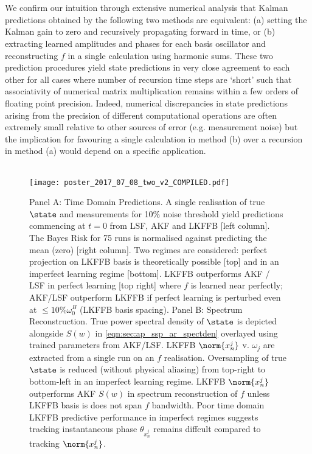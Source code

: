 \\
\\
We confirm our intuition through extensive numerical analysis that Kalman predictions obtained by the following two methods are equivalent: (a) setting the Kalman gain to zero and recursively propagating forward in time, or (b) extracting learned amplitudes and phases for each basis oscillator and reconstructing $f$ in a single calculation using harmonic sums. These two prediction procedures yield state predictions in very close agreement to each other for all cases where number of recursion time steps are `short' such that associativity of numerical matrix multiplication remains within a few orders of floating point precision. Indeed, numerical discrepancies in state predictions arising from the precision of different computational operations are often extremely small relative to other sources of error (e.g. measurement noise) but the implication for favouring a single calculation in method (b) over a recursion in method (a) would depend on a specific application.
\\
\\
 \begin{figure}[h] 
	\caption{Panel A: Time Domain Predictions. A single realisation of true $\state$ and measurements for 10\% noise threshold yield predictions commencing at $t=0$ from LSF, AKF and LKFFB  [left column]. The Bayes Risk for 75 runs is normalised against predicting the mean (zero) [right column]. Two regimes are considered: perfect projection on LKFFB basis is theoretically possible [top] and in an imperfect learning regime [bottom]. LKFFB outperforms AKF / LSF in perfect learning [top right] where $f$ is learned near perfectly; AKF/LSF outperform LKFFB if perfect learning is perturbed even at $\leq 10\% \omega_0^B$ (LKFFB basis spacing). Panel B: Spectrum Reconstruction. True power spectral density of $\state$ is depicted alongside $S(w)$ in \cref{eqn:sec:ap_ssp_ar_spectden} overlayed using trained parameters from AKF/LSF. LKFFB $\norm{x^j_n}$ v. $\omega_j$ are extracted from a single run on an $f$ realisation.  Oversampling of true $\state$ is reduced (without physical aliasing) from top-right to bottom-left in an imperfect learning regime. LKFFB $\norm{x^j_n}$ outperforms AKF $S(w)$ in spectrum reconstruction of $f$ unless LKFFB basis is does not span $f$ bandwidth. Poor time domain LKFFB predictive performance in imperfect regimes suggests tracking instantaneous phase $\theta_{x^j_n}$ remains diffcult compared to tracking $\norm{x^j_n}$. }
	\texttt{[image: poster\_2017\_07\_08\_two\_v2\_COMPILED.pdf]} 
	\label{fig:LKFFB}
\end{figure} 
